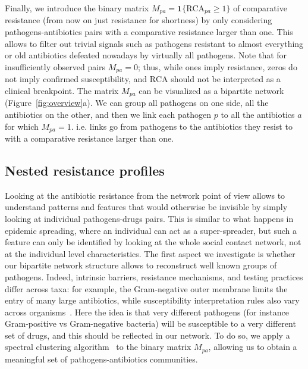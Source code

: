 \documentclass[10pt]{article}
\newcommand{\rca}{\mathrm{RCA}}
\begin{document}
Finally, we introduce the binary matrix \(M_{pa}=\mathbf 1\{\rca_{pa}\geq1\}\) of comparative resistance (from now on just resistance for shortness) by only considering pathogens-antibiotics pairs with a comparative resistance larger than one. This allows to filter out trivial signals such as pathogens resistant to almost everything or old antibiotics defeated nowadays by virtually all pathogens. Note that for insufficiently observed pairs \(M_{pa}=0\); thus, while ones imply resistance, zeros do not imply confirmed susceptibility, and $\rca$ should not be interpreted as a clinical breakpoint. The matrix $M_{pa}$ can be visualized as a bipartite network (Figure~\ref{fig:overview}a). We can group all pathogens on one side, all the antibiotics on the other, and then we link each pathogen $p$ to all the antibiotics $a$ for which $M_{pa}=1$. i.e. links go from pathogens to the antibiotics they resist to with a comparative resistance larger than one.

\subsection*{Nested resistance profiles}

Looking at the antibiotic resistance from the network point of view allows to understand patterns and features that would otherwise be invisible by simply looking at individual pathogens-drugs pairs. This is similar to what happens in epidemic spreading, where an individual can act as a super-spreader, but such a feature can only be identified by looking at the whole social contact network, not at the individual level characteristics. The first aspect we investigate is whether our bipartite network structure allows to reconstruct well known groups of pathogens. Indeed, intrinsic barriers, resistance mechanisms, and testing practices differ across taxa: for example, the Gram-negative outer membrane limits the entry of many large antibiotics, while susceptibility interpretation rules also vary across organisms~\cite{nikaido2003,leclercq2013}. Here the idea is that very different pathogens (for instance Gram-positive vs Gram-negative bacteria) will be susceptible to a very different set of drugs, and this should be reflected in our network. To do so, we apply a spectral clustering algorithm~\cite{dhillon2001} to the binary matrix $M_{pa}$, allowing us to obtain a meaningful set of pathogens-antibiotics communities.
\end{document}

